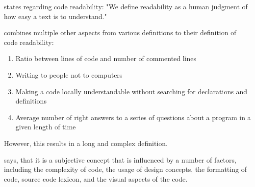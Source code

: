 \documentclass[%
class=scrreprt,
chapterprefix=false,%
open=right,%
twoside=false,%
paper=a4,%
logofile={Logo\_zentral\_farbig\_EN.png},%
thesistype=master,%
UKenglish,%
]{se2thesis}
\begin{document}

	
	\citeauthor{buse2009learning} states regarding code readability: "We define readability as a human judgment of how easy a
	text is to understand."

	\citeauthor{tashtoush2013impact} combines multiple other aspects from various definitions to their definition of code readability:
	\begin{enumerate}
		\item Ratio between lines of code and number of commented lines
		\item Writing to people not to computers
		\item Making a code locally understandable without searching for declarations and definitions
		\item Average number of right answers to a series of questions about a program in a given length of time
	\end{enumerate}	
	However, this results in a long and complex definition.
	
	\citeauthor{scalabrino2018comprehensive} says, that it is a subjective concept that is influenced by a number of factors, including the complexity of code, the usage of design concepts, the formatting of code, source code lexicon, and the visual aspects of the code.
	
\end{document}
